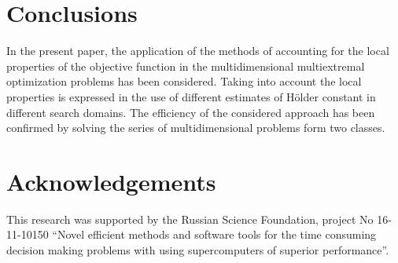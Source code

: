 \documentclass[procedia]{easychair}
\begin{document}
\section{Conclusions}
In the present paper, the application of the methods of accounting for the local
properties of the objective function
in the multidimensional multiextremal optimization problems has been considered. Taking
into account the local properties is expressed in the use of different estimates of Hölder
constant in different search domains. The efficiency of the considered approach has been
confirmed by solving the series of multidimensional problems form two classes.

\section{Acknowledgements}
This research was supported by the Russian Science Foundation, project No 16-11-10150
“Novel efficient methods and software tools for the time consuming decision making problems
with using supercomputers of superior performance”.

%
\label{sect:bib}

%
%
%



\end{document}
